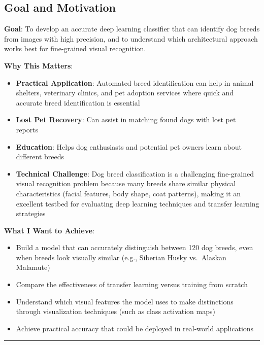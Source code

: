 \documentclass[
  letterpaper,
  DIV=11,
  numbers=noendperiod]{scrartcl}
\providecommand{\tightlist}{%
  \setlength{\itemsep}{0pt}\setlength{\parskip}{0pt}}
\begin{document}
\subsection{Goal and Motivation}\label{goal-and-motivation}

\textbf{Goal}: To develop an accurate deep learning classifier that can
identify dog breeds from images with high precision, and to understand
which architectural approach works best for fine-grained visual
recognition.

\textbf{Why This Matters}:

\begin{itemize}
\tightlist
\item
  \textbf{Practical Application}: Automated breed identification can
  help in animal shelters, veterinary clinics, and pet adoption services
  where quick and accurate breed identification is essential
\item
  \textbf{Lost Pet Recovery}: Can assist in matching found dogs with
  lost pet reports
\item
  \textbf{Education}: Helps dog enthusiasts and potential pet owners
  learn about different breeds
\item
  \textbf{Technical Challenge}: Dog breed classification is a
  challenging fine-grained visual recognition problem because many
  breeds share similar physical characteristics (facial features, body
  shape, coat patterns), making it an excellent testbed for evaluating
  deep learning techniques and transfer learning strategies
\end{itemize}

\textbf{What I Want to Achieve}:

\begin{itemize}
\tightlist
\item
  Build a model that can accurately distinguish between 120 dog breeds,
  even when breeds look visually similar (e.g., Siberian Husky
  vs.~Alaskan Malamute)
\item
  Compare the effectiveness of transfer learning versus training from
  scratch
\item
  Understand which visual features the model uses to make distinctions
  through visualization techniques (such as class activation maps)
\item
  Achieve practical accuracy that could be deployed in real-world
  applications
\end{itemize}

\begin{center}\rule{0.5\linewidth}{0.5pt}\end{center}
\end{document}
